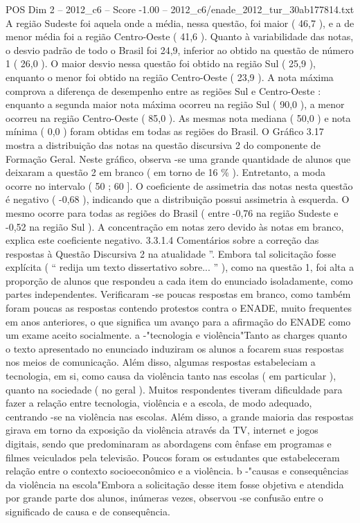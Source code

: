 \begin{textsample}{POS Dim 2 – 2012\_c6 – Score -1.00 – 2012\_c6/enade\_2012\_tur\_30ab177814.txt}
A região Sudeste foi aquela onde a média, nessa questão, foi maior ( 46,7 ), e a de menor média foi a região Centro-Oeste ( 41,6 ).
Quanto à variabilidade das notas, o desvio padrão de todo o Brasil foi 24,9, inferior ao obtido na questão de número 1 ( 26,0 ).
O maior desvio nessa questão foi obtido na região Sul ( 25,9 ), enquanto o menor foi obtido na região Centro-Oeste ( 23,9 ).
A nota máxima comprova a diferença de desempenho entre as regiões Sul e Centro-Oeste : enquanto a segunda maior nota máxima ocorreu na região Sul ( 90,0 ), a menor ocorreu na região Centro-Oeste ( 85,0 ).
As mesmas nota mediana ( 50,0 ) e nota mínima ( 0,0 ) foram obtidas em todas as regiões do Brasil.
O Gráfico 3.17 mostra a distribuição das notas na questão discursiva 2 do componente de Formação Geral.
Neste gráfico, observa -se uma grande quantidade de alunos que deixaram a questão 2 em branco ( em torno de 16 \% ).
Entretanto, a moda ocorre no intervalo ( 50 ; 60 ].
O coeficiente de assimetria das notas nesta questão é negativo ( -0,68 ), indicando que a distribuição possui assimetria à esquerda.
O mesmo ocorre para todas as regiões do Brasil ( entre -0,76 na região Sudeste e -0,52 na região Sul ).
A concentração em notas zero devido às notas em branco, explica este coeficiente negativo. 3.3.1.4 Comentários sobre a correção das respostas à Questão Discursiva 2 na atualidade ”.
Embora tal solicitação fosse explícita ( “ redija um texto dissertativo sobre... ” ), como na questão 1, foi alta a proporção de alunos que respondeu a cada item do enunciado isoladamente, como partes independentes.
Verificaram -se poucas respostas em branco, como também foram poucas as respostas contendo protestos contra o ENADE, muito frequentes em anos anteriores, o que significa um avanço para a afirmação do ENADE como um exame aceito socialmente. a -"tecnologia e violência"Tanto as charges quanto o texto apresentado no enunciado induziram os alunos a focarem suas respostas nos meios de comunicação.
Além disso, algumas respostas estabeleciam a tecnologia, em si, como causa da violência tanto nas escolas ( em particular ), quanto na sociedade ( no geral ).
Muitos respondentes tiveram dificuldade para fazer a relação entre tecnologia, violência e a escola, de modo adequado, centrando -se na violência nas escolas.
Além disso, a grande maioria das respostas girava em torno da exposição da violência através da TV, internet e jogos digitais, sendo que predominaram as abordagens com ênfase em programas e filmes veiculados pela televisão.
Poucos foram os estudantes que estabeleceram relação entre o contexto socioeconômico e a violência. b -"causas e consequências da violência na escola"Embora a solicitação desse item fosse objetiva e atendida por grande parte dos alunos, inúmeras vezes, observou -se confusão entre o significado de causa e de consequência.

\end{textsample}

